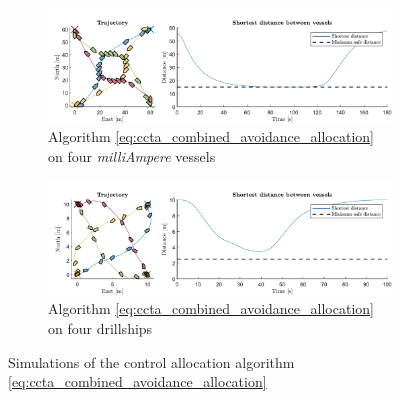 \begin{figure}[t]
    \centering
    \begin{subfigure}{0.8\linewidth}
        \centering
        \includegraphics[width = \textwidth]{figures/ccta/milliAmpere_orig.pdf}
        \caption{Algorithm \eqref{eq:ccta_combined_avoidance_allocation} on four \emph{milliAmpere} vessels}
        \vspace*{1em}
    \end{subfigure}
    \begin{subfigure}{0.8\linewidth}
        \centering
        \includegraphics[width = \textwidth]{figures/ccta/drillship_orig.pdf}
        \caption{Algorithm \eqref{eq:ccta_combined_avoidance_allocation} on four drillships}
    \end{subfigure}
    \caption{Simulations of the control allocation algorithm \eqref{eq:ccta_combined_avoidance_allocation}}
    \label{fig:ccta_orig}
\end{figure}


